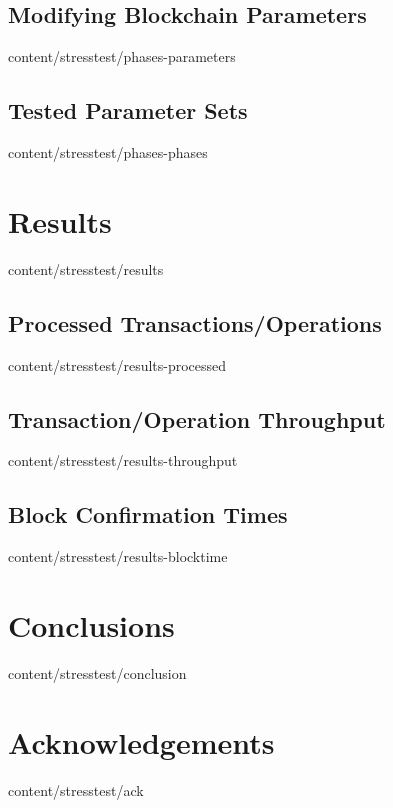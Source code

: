 \documentclass{btswhitepaper}
\begin{document}
\subsection { Modifying Blockchain Parameters    }  { content/stresstest/phases-parameters  } 
\subsection { Tested Parameter Sets              }  { content/stresstest/phases-phases      } 
\section    { Results                            }  { content/stresstest/results            } 
\subsection { Processed Transactions/Operations  }  { content/stresstest/results-processed  } 
\subsection { Transaction/Operation Throughput   }  { content/stresstest/results-throughput } 
\subsection { Block Confirmation Times           }  { content/stresstest/results-blocktime  } 
\section    { Conclusions                        }  { content/stresstest/conclusion         } 
\section    { Acknowledgements                   }  { content/stresstest/ack                } 



\end{document}
